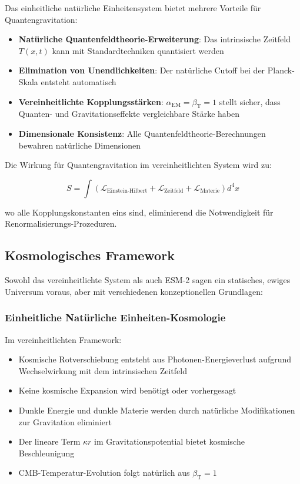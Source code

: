 \documentclass[12pt,a4paper]{article}
\newcommand{\Tfieldt}{T(x,t)}
\newcommand{\alphaEM}{\alpha_{\text{EM}}}
\newcommand{\betaT}{\beta_{\text{T}}}
\begin{document}
	Das einheitliche natürliche Einheitensystem bietet mehrere Vorteile für Quantengravitation:
	
	\begin{itemize}
		\item \textbf{Natürliche Quantenfeldtheorie-Erweiterung}: Das intrinsische Zeitfeld $\Tfieldt$ kann mit Standardtechniken quantisiert werden
		\item \textbf{Elimination von Unendlichkeiten}: Der natürliche Cutoff bei der Planck-Skala entsteht automatisch
		\item \textbf{Vereinheitlichte Kopplungsstärken}: $\alphaEM = \betaT = 1$ stellt sicher, dass Quanten- und Gravitationseffekte vergleichbare Stärke haben
		\item \textbf{Dimensionale Konsistenz}: Alle Quantenfeldtheorie-Berechnungen bewahren natürliche Dimensionen
	\end{itemize}
	
	Die Wirkung für Quantengravitation im vereinheitlichten System wird zu:
	
	\begin{equation}
		S = \int \left( \mathcal{L}_{\text{Einstein-Hilbert}} + \mathcal{L}_{\text{Zeitfeld}} + \mathcal{L}_{\text{Materie}} \right) d^4x
	\end{equation}
	
	wo alle Kopplungskonstanten eins sind, eliminierend die Notwendigkeit für Renormalisierungs-Prozeduren.
	
	\subsection{Kosmologisches Framework}
	\label{subsec:cosmological_framework}
	
	Sowohl das vereinheitlichte System als auch ESM-2 sagen ein statisches, ewiges Universum voraus, aber mit verschiedenen konzeptionellen Grundlagen:
	
	\subsubsection{Einheitliche Natürliche Einheiten-Kosmologie}
	\label{subsubsec:unified_cosmology}
	
	Im vereinheitlichten Framework:
	\begin{itemize}
		\item Kosmische Rotverschiebung entsteht aus Photonen-Energieverlust aufgrund Wechselwirkung mit dem intrinsischen Zeitfeld
		\item Keine kosmische Expansion wird benötigt oder vorhergesagt
		\item Dunkle Energie und dunkle Materie werden durch natürliche Modifikationen zur Gravitation eliminiert
		\item Der lineare Term $\kappa r$ im Gravitationspotential bietet kosmische Beschleunigung
		\item CMB-Temperatur-Evolution folgt natürlich aus $\betaT = 1$
	\end{itemize}
	
\end{document}
